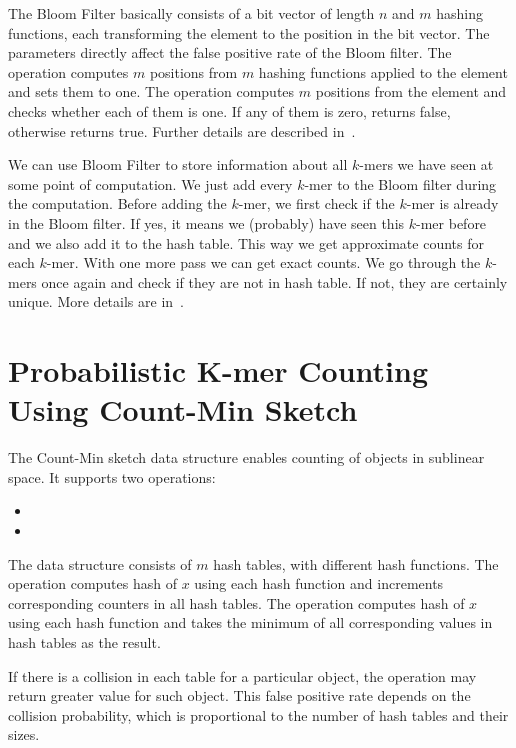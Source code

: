 The Bloom Filter basically consists of a bit vector of length $n$ and $m$ hashing functions, each transforming the element to the position in the bit vector. The parameters directly affect the false positive rate of the Bloom filter.
The  operation computes $m$ positions from $m$ hashing functions applied to the element and sets them to one.
The  operation computes $m$ positions from the element and checks whether each of them is one. If any of them is zero, returns false, otherwise returns true. Further details are described in~\cite{bloomfilter}.

We can use Bloom Filter to store information about all $k$-mers we have seen at some point of computation. We just add every $k$-mer to the Bloom filter during the computation. Before adding the $k$-mer, we first check if the $k$-mer is already in the Bloom filter. If yes, it means we (probably) have seen this $k$-mer before and we also add it to the hash table. This way we get approximate counts for each $k$-mer.
With one more pass we can get exact counts. We go through the $k$-mers once again and check if they are not in hash table. If not, they are certainly unique. More details are in~\cite{bfcounter}.

\section[Probabilistic K-mer Counting]{Probabilistic K-mer Counting Using Count-Min Sketch}

The Count-Min sketch\cite{countminsketch} data structure enables counting of objects in sublinear space. It supports two operations:
\begin{itemize}
  \item {} %
  \item {} %
\end{itemize}

The data structure consists of $m$ hash tables, with different hash functions.
The  operation computes hash of $x$ using each hash function and increments corresponding counters in all hash tables. The  operation computes hash of $x$ using each hash function and takes the minimum of all corresponding values in hash tables as the result. %

If there is a collision in each table for a particular object, the  operation may return greater value for such object. This false positive rate depends on the collision probability, which is proportional to the number of hash tables and their sizes.


